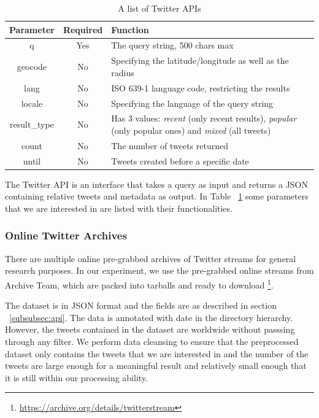 \documentclass[12pt, oneside]{article}
\begin{document}
\begin{table}[h]
  \centering
  \caption{A list of Twitter APIs}
  \label{table:api}
  \begin{tabularx}{.75\textwidth}{ |c|c|X| }
    \hline
    \textbf{Parameter} & \textbf{Required} & \textbf{Function} \\
    \hline
    \hline
    q & Yes & The query string, 500 chars max \\
    \hline
    geocode & No & Specifying the latitude/longitude as well as the radius \\
    \hline
    lang & No & ISO 639-1 language code, restricting the results \\
    \hline
    locale & No & Specifying the language of the query string \\
    \hline
    result\_type & No & Has 3 values: \textit{recent} (only recent results), \textit{popular} (only popular ones) and \textit{mixed} (all tweets) \\
    \hline
    count & No & The number of tweets returned \\
    \hline
    until & No & Tweets created before a specific date \\
    \hline
  \end{tabularx}
\end{table}

The Twitter API is an interface that takes a query as input and returns a JSON containing relative tweets and metadata as output.
In Table ~\ref{table:api} some parameters that we are interested in are listed with their functionalities.

\subsubsection{Online Twitter Archives}
\label{subsubsec:archives}

There are multiple online pre-grabbed archives of Twitter streams for general research purposes. In our experiment, we use the pre-grabbed online streams from Archive Team,
which are packed into tarballs and ready to download \footnote{\url{https://archive.org/details/twitterstream}}.

The dataset is in JSON format and the fields are as described in section ~\ref{subsubsec:api}. The data is annotated with date in the directory hierarchy. However,
the tweets contained in the dataset are worldwide without passsing through any filter. We perform data cleansing to ensure that the preprocessed dataset only
contains the tweets that we are interested in and the number of the tweets are large enough for a meaningful result and relatively small enough that it is still
within our processing ability.
\end{document}
